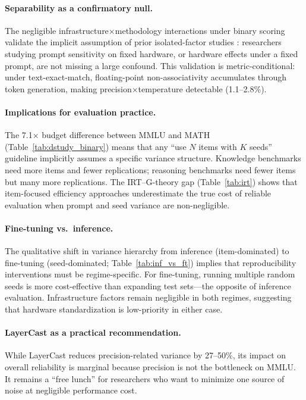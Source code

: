 \documentclass[11pt,twocolumn]{article}
\begin{document}
\paragraph{Separability as a confirmatory null.}
The negligible infrastructure$\times$methodology interactions under binary scoring validate the implicit assumption of prior isolated-factor studies \citep{yuan2025,brittlebench2026}: researchers studying prompt sensitivity on fixed hardware, or hardware effects under a fixed prompt, are not missing a large confound.
This validation is metric-conditional: under text-exact-match, floating-point non-associativity accumulates through token generation, making precision$\times$temperature detectable (1.1--2.8\%).

\paragraph{Implications for evaluation practice.}
The 7.1$\times$ budget difference between MMLU and MATH (Table~\ref{tab:dstudy_binary}) means that any ``use $N$ items with $K$ seeds'' guideline implicitly assumes a specific variance structure.
Knowledge benchmarks need more items and fewer replications; reasoning benchmarks need fewer items but many more replications.
The IRT--G-theory gap (Table~\ref{tab:irt}) shows that item-focused efficiency approaches underestimate the true cost of reliable evaluation when prompt and seed variance are non-negligible.

\paragraph{Fine-tuning vs.\ inference.}
The qualitative shift in variance hierarchy from inference (item-dominated) to fine-tuning (seed-dominated; Table~\ref{tab:inf_vs_ft}) implies that reproducibility interventions must be regime-specific.
For fine-tuning, running multiple random seeds is more cost-effective than expanding test sets---the opposite of inference evaluation.
Infrastructure factors remain negligible in both regimes, suggesting that hardware standardization is low-priority in either case.

\paragraph{LayerCast as a practical recommendation.}
While LayerCast reduces precision-related variance by 27--50\%, its impact on overall reliability is marginal because precision is not the bottleneck on MMLU.
It remains a ``free lunch'' for researchers who want to minimize one source of noise at negligible performance cost.
\end{document}

